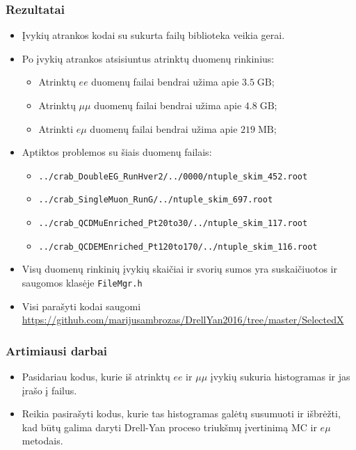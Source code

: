 \documentclass{beamer}
\newcommand{\emu}{\mathit{e}\mu}
\newcommand{\ee}{\mathit{ee}}
\begin{document}
\begin{frame}
\frametitle{Rezultatai}

\begin{itemize}
	\item Įvykių atrankos kodai su sukurta failų biblioteka veikia gerai.
	\item Po įvykių atrankos atsisiuntus atrinktų duomenų rinkinius:
	\begin{itemize}
		\item Atrinktų $\ee$ duomenų failai bendrai užima apie $3.5\; \mathrm{GB}$;
		\item Atrinktų $\mu\mu$  duomenų failai bendrai užima apie $4.8\; \mathrm{GB}$;
		\item Atrinkti $\emu$ duomenų failai bendrai užima apie $219\; \mathrm{MB}$;
	\end{itemize}
	\item Aptiktos problemos su šiais duomenų failais:
	\begin{itemize}
		\item \texttt{../crab\_DoubleEG\_RunHver2/../0000/ntuple\_skim\_452.root}
		\item \texttt{../crab\_SingleMuon\_RunG/../ntuple\_skim\_697.root}
		\item \texttt{../crab\_QCDMuEnriched\_Pt20to30/../ntuple\_skim\_117.root}
		\item \texttt{../crab\_QCDEMEnriched\_Pt120to170/../ntuple\_skim\_116.root}
	\end{itemize}
	\item Visų duomenų rinkinių įvykių skaičiai ir svorių sumos yra suskaičiuotos ir saugomos klasėje \texttt{FileMgr.h}
	\item Visi parašyti kodai saugomi \url{https://github.com/marijusambrozas/DrellYan2016/tree/master/SelectedX}
\end{itemize}

\end{frame}


\begin{frame}
\frametitle{Artimiausi darbai}

\begin{itemize}
	\item Pasidariau kodus, kurie iš atrinktų $\ee$ ir $\mu\mu$ įvykių sukuria histogramas ir jas įrašo į failus.
	\item Reikia pasirašyti kodus, kurie tas histogramas galėtų susumuoti ir išbrėžti, kad būtų galima daryti Drell-Yan proceso triukšmų įvertinimą MC ir $\emu$ metodais.
\end{itemize}

\end{frame}
\end{document}
